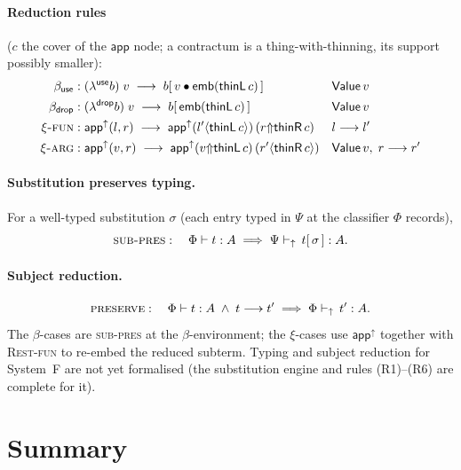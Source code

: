 \documentclass{article}
\newcommand{\thL}{\mathsf{thinL}}
\newcommand{\thR}{\mathsf{thinR}}
\newcommand{\wt}[2]{#1 {\Uparrow} #2}              %
\newcommand{\ren}[2]{#1\langle#2\rangle}           %
\newcommand{\appU}{\mathsf{app}^{{\uparrow}}}
\newcommand{\emb}{\mathsf{emb}}
\newcommand{\ins}[1]{[\,#1\,]}                      %
\newcommand{\cons}{\mathbin{\bullet}}               %
\newcommand{\val}{\mathsf{Value}}
\newcommand{\rw}{\;\longrightarrow\;}              %
\newcommand{\steps}{\longrightarrow}
\theoremstyle{plain}
\begin{document}
\paragraph{Reduction rules} ($c$ the cover of the $\mathsf{app}$ node; a contractum is a
thing-with-thinning, its support possibly smaller):
\begin{align}
  \textsc{$\beta_{\mathsf{use}}$} &:
    (\lambda^{\mathsf{use}} b)\;v \rw b\ins{v\cons\emb(\thL\,c)}
    && \val\,v \label{r:betaUse}\\
  \textsc{$\beta_{\mathsf{drop}}$} &:
    (\lambda^{\mathsf{drop}} b)\;v \rw b\ins{\emb(\thL\,c)}
    && \val\,v \label{r:betaDrop}\\
  \textsc{$\xi$-fun} &:
    \appU(l,r) \rw \appU(\ren{l'}{\thL\,c})\,(\wt{r}{\thR\,c})
    && l\steps l' \label{r:xiFun}\\
  \textsc{$\xi$-arg} &:
    \appU(v,r) \rw \appU(\wt{v}{\thL\,c})\,(\ren{r'}{\thR\,c})
    && \val\,v,\; r\steps r' \label{r:xiArg}
\end{align}

\paragraph{Substitution preserves typing.}
For a well-typed substitution $\sigma$ (each entry typed in $\Psi$ at the
classifier $\Phi$ records),
\[
  \textsc{sub-pres}:\quad \Phi\vdash t:A \;\Longrightarrow\; \Psi\vdash_{\uparrow}\,t\ins\sigma:A.
\]

\paragraph{Subject reduction.}
\[
  \textsc{preserve}:\quad \Phi\vdash t:A \;\wedge\; t\steps t' \;\Longrightarrow\; \Phi\vdash_{\uparrow}\,t':A.
\]
The $\beta$-cases are \textsc{sub-pres} at the $\beta$-environment; the $\xi$-cases use
$\appU$ together with \textsc{Rest-fun} to re-embed the reduced subterm.
Typing and subject reduction for System~F are not yet formalised
(the substitution engine and rules \textnormal{(R1)--(R6)} are complete for it).

\section*{Summary}
\end{document}
